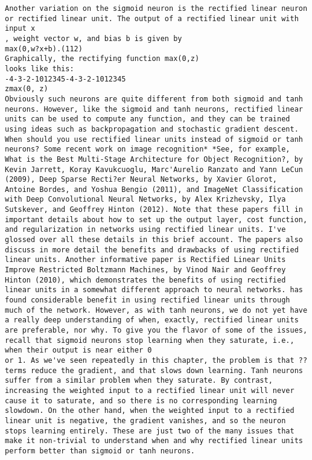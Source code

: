 \begin{lstlisting}
Another variation on the sigmoid neuron is the rectified linear neuron or rectified linear unit. The output of a rectified linear unit with input x
, weight vector w, and bias b is given by 
max(0,w?x+b).(112)
Graphically, the rectifying function max(0,z)
looks like this:
-4-3-2-1012345-4-3-2-1012345
zmax(0, z)
Obviously such neurons are quite different from both sigmoid and tanh neurons. However, like the sigmoid and tanh neurons, rectified linear units can be used to compute any function, and they can be trained using ideas such as backpropagation and stochastic gradient descent.
When should you use rectified linear units instead of sigmoid or tanh neurons? Some recent work on image recognition* *See, for example, What is the Best Multi-Stage Architecture for Object Recognition?, by Kevin Jarrett, Koray Kavukcuoglu, Marc'Aurelio Ranzato and Yann LeCun (2009), Deep Sparse Recti?er Neural Networks, by Xavier Glorot, Antoine Bordes, and Yoshua Bengio (2011), and ImageNet Classification with Deep Convolutional Neural Networks, by Alex Krizhevsky, Ilya Sutskever, and Geoffrey Hinton (2012). Note that these papers fill in important details about how to set up the output layer, cost function, and regularization in networks using rectified linear units. I've glossed over all these details in this brief account. The papers also discuss in more detail the benefits and drawbacks of using rectified linear units. Another informative paper is Rectified Linear Units Improve Restricted Boltzmann Machines, by Vinod Nair and Geoffrey Hinton (2010), which demonstrates the benefits of using rectified linear units in a somewhat different approach to neural networks. has found considerable benefit in using rectified linear units through much of the network. However, as with tanh neurons, we do not yet have a really deep understanding of when, exactly, rectified linear units are preferable, nor why. To give you the flavor of some of the issues, recall that sigmoid neurons stop learning when they saturate, i.e., when their output is near either 0
or 1. As we've seen repeatedly in this chapter, the problem is that ??
terms reduce the gradient, and that slows down learning. Tanh neurons suffer from a similar problem when they saturate. By contrast, increasing the weighted input to a rectified linear unit will never cause it to saturate, and so there is no corresponding learning slowdown. On the other hand, when the weighted input to a rectified linear unit is negative, the gradient vanishes, and so the neuron stops learning entirely. These are just two of the many issues that make it non-trivial to understand when and why rectified linear units perform better than sigmoid or tanh neurons.

\end{lstlisting}
